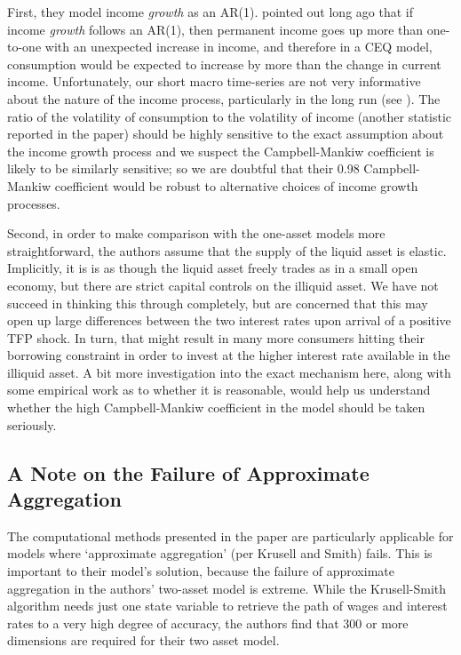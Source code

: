\documentclass[titlepage]{econtex}
\begin{document}
First, they model income \textit{growth} as an AR(1).  \cite{cdSmooth} pointed out long ago that if income \textit{growth} follows an AR(1), then permanent income goes up more than one-to-one with an unexpected increase in income, and therefore in a CEQ model, consumption would be expected to increase by more than the change in current income. Unfortunately, our short macro time-series are not very informative about the nature of the income process, particularly in the long run (see \cite{stock_confidence_1991}). The ratio of the volatility of consumption to the volatility of income (another statistic reported in the paper) should be highly sensitive to the exact assumption about the income growth process and we suspect the Campbell-Mankiw coefficient is likely to be similarly sensitive; so we are doubtful that their 0.98 Campbell-Mankiw coefficient would be robust to alternative choices of income growth processes.

Second, in order to make comparison with the one-asset models more straightforward, the authors assume that the supply of the liquid asset is elastic. Implicitly, it is is as though the liquid asset freely trades as in a small open economy, but there are strict capital controls on the illiquid asset. We have not succeed in thinking this through completely,  but are concerned that this may open up large differences between the two interest rates upon arrival of a positive TFP shock. In turn, that might result in many more consumers hitting their borrowing constraint in order to invest at the higher interest rate available in the illiquid asset. A bit more investigation into the exact mechanism here, along with some empirical work as to whether it is reasonable, would help us understand whether the high Campbell-Mankiw coefficient in the model should be taken seriously.


\subsection{A Note on the Failure of Approximate Aggregation}
The computational methods presented in the paper are particularly applicable for models where `approximate aggregation' (per Krusell and Smith) fails. This is important to their model's solution, because the failure of approximate aggregation in the authors' two-asset model is extreme. While the Krusell-Smith algorithm needs just one state variable to retrieve the path of wages and interest rates to a very high degree of accuracy, the authors find that 300 or more dimensions are required for their two asset model.
\end{document}

